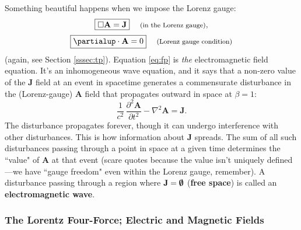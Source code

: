 \documentclass[12pt]{article}
\renewcommand{\vv}[1]{\mathbf{#1}}
\begin{document}
Something beautiful happens when we impose the Lorenz gauge:
\begin{equation}\label{eq:fp}
\boxed{ \Box \vv A = \vv J } \quad \textrm{\footnotesize{ (in the Lorenz gauge)}} ,
\end{equation}
\begin{equation}\label{eq:lg}
\boxed{ \partialup \cdot \vv A = 0 } \quad \textrm{\footnotesize{ (Lorenz gauge condition)}}
\end{equation}
(again, see Section \ref{sssec:tp}). Equation \ref{eq:fp} is \emph{the} electromagnetic field equation. It's an inhomogeneous wave equation, and it says that a non-zero value of the $\vv J$ field at an event in spacetime generates a commensurate disturbance in the (Lorenz-gauge) $\vv A$ field that propagates outward in space at $\beta = 1$:
\begin{equation*}
\dfrac{1}{c^2} \, \dfrac{\partial^2 \vv A}{\partial t^2} - \nabla ^2 \vv A = \vv J .
\end{equation*}
The disturbance propagates forever, though it can undergo interference with other disturbances. This is how information about $\vv J$ spreads. The sum of all such disturbances passing through a point in space at a given time determines the ``value" of $\vv A$ at that event (scare quotes because the value isn't uniquely defined---we have ``gauge freedom" even within the Lorenz gauge, remember). A disturbance passing through a region where $\vv J = \textrm{\mbox{\boldmath $\emptyset$}}$ (\textbf{free space}) is called an \textbf{electromagnetic wave}.


\subsubsection{The Lorentz Four-Force; Electric and Magnetic Fields}\label{sssec:lff}
\end{document}
